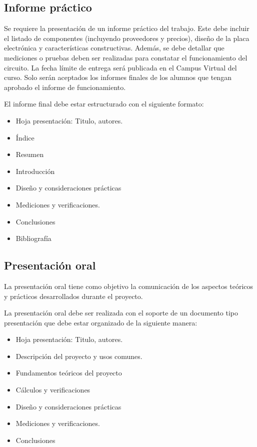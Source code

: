 \subsection{Informe práctico}

Se requiere la presentación de un informe práctico del trabajo.
Este debe incluir el listado de componentes (incluyendo proveedores y precios), diseño de la placa electrónica y características constructivas. 
Además, se debe detallar que mediciones o pruebas deben ser realizadas para constatar el funcionamiento del circuito. 
La fecha límite de entrega será publicada en el Campus Virtual del curso. Solo serán aceptados los informes finales de los alumnos que tengan aprobado el informe de funcionamiento. 

El informe final debe estar estructurado con el siguiente formato:

\begin{itemize}
    \item Hoja presentación: Titulo, autores.
    \item Índice
    \item Resumen
    \item Introducción
    \item Diseño y consideraciones prácticas
    \item Mediciones y verificaciones.
    \item Conclusiones
    \item Bibliografía
\end{itemize}

\subsection{Presentación oral}

La presentación oral tiene como objetivo la comunicación de los aspectos teóricos y prácticos desarrollados durante el proyecto. 

La presentación oral debe ser realizada con el soporte de un documento tipo presentación que debe estar organizado de la siguiente manera:

\begin{itemize}
    \item Hoja presentación: Titulo, autores.
    \item Descripción del proyecto y usos comunes. 
    \item Fundamentos teóricos del proyecto
    \item Cálculos y verificaciones
    \item Diseño y consideraciones prácticas
    \item Mediciones y verificaciones.
    \item Conclusiones
\end{itemize}